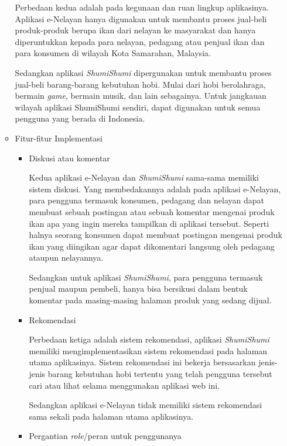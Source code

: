 \documentclass[a4paper]{article}
\begin{document}
\begin{enumerate}
\begin{itemize}
        Perbedaan kedua adalah pada kegunaan dan ruan lingkup aplikasinya. Aplikasi e-Nelayan hanya digunakan untuk membantu proses jual-beli produk-produk berupa ikan dari nelayan ke masyarakat dan hanya diperuntukkan kepada para nelayan, pedagang atau penjual ikan dan para konsumen di wilayah Kota Samarahan, Malaysia\autocite{fishes-marketplace}.

        Sedangkan aplikasi \textit{ShumiShumi} dipergunakan untuk membantu proses jual-beli barang-barang kebutuhan hobi. Mulai dari hobi berolahraga, bermain \textit{game}, bermain musik, dan lain sebagainya. Untuk jangkauan wilayah aplikasi ShumiShumi sendiri, dapat digunakan untuk semua pengguna yang berada di Indonesia.

        \item Fitur-fitur Implementasi

        \begin{itemize}
            \item Diskusi atau komentar

            Kedua aplikasi e-Nelayan dan \textit{ShumiShumi} sama-sama memiliki sistem diskusi. Yang membedakannya adalah pada aplikasi e-Nelayan, para pengguna termasuk konsumen, pedagang dan nelayan dapat membuat sebuah postingan atau sebuah komentar mengenai produk ikan apa yang ingin mereka tampilkan di aplikasi tersebut. Seperti halnya seorang konsumen dapat membuat postingan mengenai produk ikan yang diingikan agar dapat dikomentari langsung oleh pedagang ataupun nelayannya\autocite{fishes-marketplace}.

            Sedangkan untuk aplikasi \textit{ShumiShumi}, para pengguna termasuk penjual maupun pembeli, hanya bisa bersikusi dalam bentuk komentar pada masing-masing halaman produk yang sedang dijual.

            \item Rekomendasi

            Perbedaan ketiga adalah sistem rekomendasi, aplikasi \textit{ShumiShumi} memiliki mengimplementasikan sistem rekomendasi pada halaman utama aplikasinya. Sistem rekomendasi ini bekerja bersasarkan jenis-jenis barang kebutuhan hobi tertentu yang telah pengguna tersebut cari atau lihat selama menggunakan aplikasi web ini.

            Sedangkan aplikasi e-Nelayan tidak memiliki sistem rekomendasi sama sekali pada halaman utama aplikasinya\autocite{fishes-marketplace}.

            \item Pergantian \textit{role}/peran untuk penggunanya


\end{itemize}
\end{itemize}
\end{enumerate}
\end{document}
